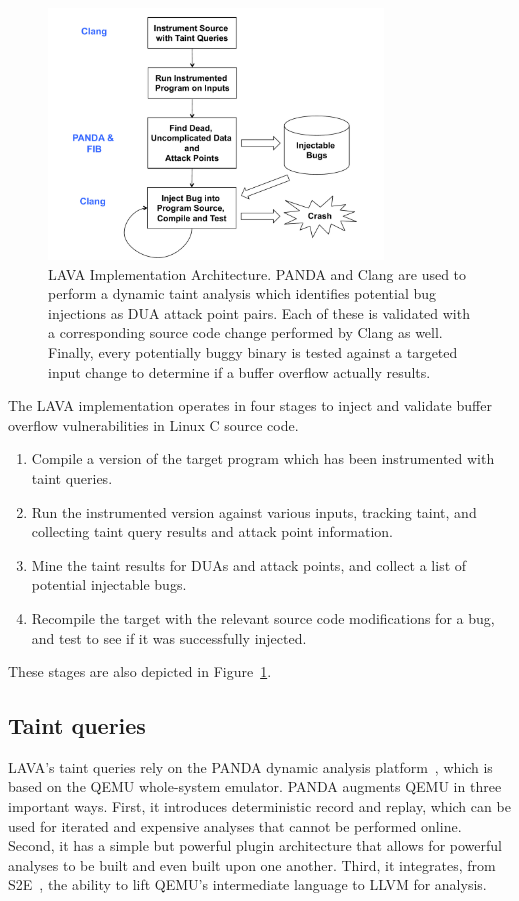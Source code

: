 
\begin{figure}
\centering
\includegraphics[width=3.5in]{lava-arch.pdf}
\caption{LAVA Implementation Architecture.  PANDA and Clang  are used to perform a dynamic taint analysis which identifies potential bug injections as DUA attack point pairs.
Each of these is validated with a corresponding source code change performed by Clang  as well.
Finally, every potentially buggy binary is tested against a targeted input change to determine if a buffer overflow actually results.}
\label{fig:lava-impl}
\end{figure}


The LAVA implementation operates in four stages to inject and validate buffer overflow vulnerabilities in Linux C source code. 

\begin{enumerate}
\item Compile a version of the target program which has been instrumented with taint queries.
\item Run the instrumented version against various inputs, tracking taint, and collecting taint query results and attack point information.
\item Mine the taint results for DUAs and attack points, and collect a list of potential injectable bugs.
\item Recompile the target with the relevant source code modifications for a bug, and test to see if it was successfully injected.
\end{enumerate}

These stages are also depicted in Figure~\ref{fig:lava-impl}.

\subsection{Taint queries}
LAVA's taint queries rely on the PANDA dynamic analysis platform~\cite{PANDA}, which is based on the QEMU whole-system emulator.
PANDA augments QEMU in three important ways.
First, it introduces deterministic record and replay, which can be used for iterated and expensive analyses that cannot be performed online.
Second, it has a simple but powerful plugin architecture that allows for powerful analyses to be built and even built upon one another.
Third, it integrates, from S2E~\cite{S2E}, the ability to lift QEMU's intermediate language to LLVM for analysis.


